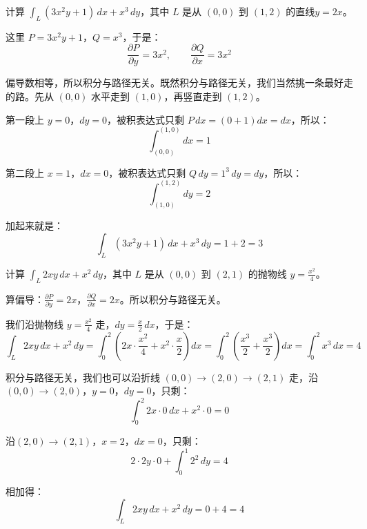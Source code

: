 \begin{myexample}
    计算 \(\int_L (3x^2y+1)\,dx + x^3\,dy\)，其中 \(L\) 是从 \((0,0)\) 到 \((1,2)\) 的直线\(y=2x\)。

    这里 \(P=3x^2y+1\)，\(Q=x^3\)，于是：
    \[
    \frac{\partial P}{\partial y} = 3x^2,\qquad \frac{\partial Q}{\partial x} = 3x^2
    \]

    偏导数相等，所以积分与路径无关。既然积分与路径无关，我们当然挑一条最好走的路。先从 \((0,0)\) 水平走到 \((1,0)\)，再竖直走到 \((1,2)\)。

    第一段上 \(y=0\)，\(dy=0\)，被积表达式只剩 \(P\,dx=(0+1)dx=dx\)，所以：
    \[
    \int_{(0,0)}^{(1,0)} dx = 1
    \]

    第二段上 \(x=1\)，\(dx=0\)，被积表达式只剩 \(Q\,dy=1^3\,dy=dy\)，所以：
    \[
    \int_{(1,0)}^{(1,2)} dy = 2
    \]

    加起来就是：
    \[
    \int_L (3x^2y+1)\,dx + x^3\,dy = 1+2 = 3
    \]
\end{myexample}

\begin{myexample}
    计算 \(\int_L 2xy\,dx + x^2\,dy\)，其中 \(L\) 是从 \((0,0)\) 到 \((2,1)\) 的抛物线 \(y=\frac{x^2}{4}\)。

    算偏导：\(\frac{\partial P}{\partial y}=2x\)，\(\frac{\partial Q}{\partial x}=2x\)。所以积分与路径无关。

    我们沿抛物线 \(y=\frac{x^2}{4}\) 走，\(dy=\frac{x}{2}\,dx\)，于是：
    \[
    \int_L 2xy\,dx + x^2\,dy = \int_0^2 \left(2x\cdot\frac{x^2}{4} + x^2\cdot\frac{x}{2}\right)dx = \int_0^2 \left(\frac{x^3}{2}+\frac{x^3}{2}\right)dx = \int_0^2 x^3\,dx = 4
    \]

    积分与路径无关，我们也可以沿折线 \((0,0)\to(2,0)\to(2,1)\) 走，沿\((0,0)\to(2,0)\)，\(y=0\)，\(dy=0\)，只剩：
    \[
    \int_0^2 2x \cdot0\,dx + x^2 \cdot 0=0 
    \]
    
    沿\((2,0)\to(2,1)\)，\(x=2\)，\(dx=0\)，只剩：
    \[
    2 \cdot 2y \cdot 0 + \int_0^1 2^2 \, dy=4
    \]

    相加得：
    \[
    \int_L 2xy\,dx + x^2\,dy = 0 + 4 =4
    \]
\end{myexample}

